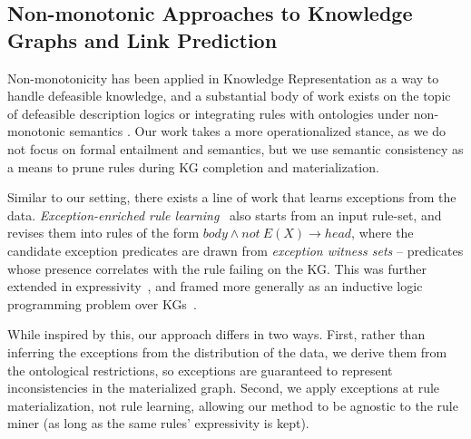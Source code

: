 \documentclass[a4paper,UKenglish,cleveref, autoref, thm-restate]{tgdk-v2021}
\begin{document}
\subsection{Non-monotonic Approaches to Knowledge Graphs and Link Prediction}

Non-monotonicity has been applied in Knowledge Representation as a way to handle defeasible knowledge, and a substantial body of work exists on the topic of defeasible description logics \cite{britz_principles_2020} or integrating rules with ontologies under non-monotonic semantics \cite{eiter_combining_2008}. Our work takes a more operationalized stance, as we do not focus on formal entailment and semantics, but we use semantic consistency as a means to prune rules during KG completion and materialization.

Similar to our setting, there exists a line of work that learns exceptions from the data. \textit{Exception-enriched rule learning}~\cite{gad-elrab_exception-enriched_2016} also starts from an input rule-set, and revises them into rules of the form $body \wedge not\ E(X) \rightarrow head$, where the candidate exception predicates are drawn from \textit{exception witness sets} -- predicates whose presence correlates with the rule failing on the KG. This was further extended in expressivity~\cite{tran_towards_2017}, and framed more generally as an inductive logic programming problem over KGs~\cite{lisi_combining_2017,muggleton_inductive_1991}.                                         

While inspired by this, our approach differs in two ways. First, rather than inferring the exceptions from the distribution of the data, we derive them from the ontological restrictions, so exceptions are guaranteed to represent inconsistencies in the materialized graph. Second, we apply exceptions at rule materialization, not rule learning, allowing our method to be agnostic to the rule miner (as long as the same rules' expressivity is kept).
\end{document}
